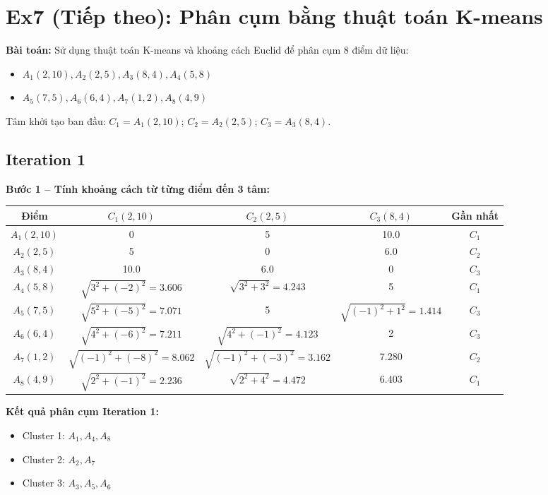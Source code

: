 \section{Ex7 (Tiếp theo): Phân cụm bằng thuật toán K-means}

\textbf{Bài toán:} Sử dụng thuật toán K-means và khoảng cách Euclid để phân cụm 8 điểm dữ liệu:
\begin{itemize}
    \item $A_1(2,10), A_2(2,5), A_3(8,4), A_4(5,8)$
    \item $A_5(7,5), A_6(6,4), A_7(1,2), A_8(4,9)$
\end{itemize}
Tâm khởi tạo ban đầu: $C_1 = A_1(2,10)$; $C_2 = A_2(2,5)$; $C_3 = A_3(8,4)$.

\subsection*{Iteration 1}
\textbf{Bước 1 -- Tính khoảng cách từ từng điểm đến 3 tâm:}
\begin{table}[H]
    \centering
    \begin{tabular}{|c|c|c|c|c|}
        \hline
        \textbf{Điểm} & \textbf{$C_1(2, 10)$} & \textbf{$C_2(2, 5)$} & \textbf{$C_3(8, 4)$} & \textbf{Gần nhất} \\
        \hline
        $A_1(2,10)$ & 0 & 5 & 10.0 & $C_1$ \\ \hline
        $A_2(2,5)$ & 5 & 0 & 6.0 & $C_2$ \\ \hline
        $A_3(8,4)$ & 10.0 & 6.0 & 0 & $C_3$ \\ \hline
        $A_4(5,8)$ & $\sqrt{3^2+(-2)^2} = 3.606$ & $\sqrt{3^2+3^2} = 4.243$ & 5 & $C_1$ \\ \hline
        $A_5(7,5)$ & $\sqrt{5^2+(-5)^2} = 7.071$ & 5 & $\sqrt{(-1)^2+1^2} = 1.414$ & $C_3$ \\ \hline
        $A_6(6,4)$ & $\sqrt{4^2+(-6)^2} = 7.211$ & $\sqrt{4^2+(-1)^2} = 4.123$ & 2 & $C_3$ \\ \hline
        $A_7(1,2)$ & $\sqrt{(-1)^2+(-8)^2} = 8.062$ & $\sqrt{(-1)^2+(-3)^2} = 3.162$ & 7.280 & $C_2$ \\ \hline
        $A_8(4,9)$ & $\sqrt{2^2+(-1)^2} = 2.236$ & $\sqrt{2^2+4^2} = 4.472$ & 6.403 & $C_1$ \\ \hline
    \end{tabular}
\end{table}

\textbf{Kết quả phân cụm Iteration 1:}
\begin{itemize}
    \item Cluster 1: $A_1, A_4, A_8$
    \item Cluster 2: $A_2, A_7$
    \item Cluster 3: $A_3, A_5, A_6$
\end{itemize}

